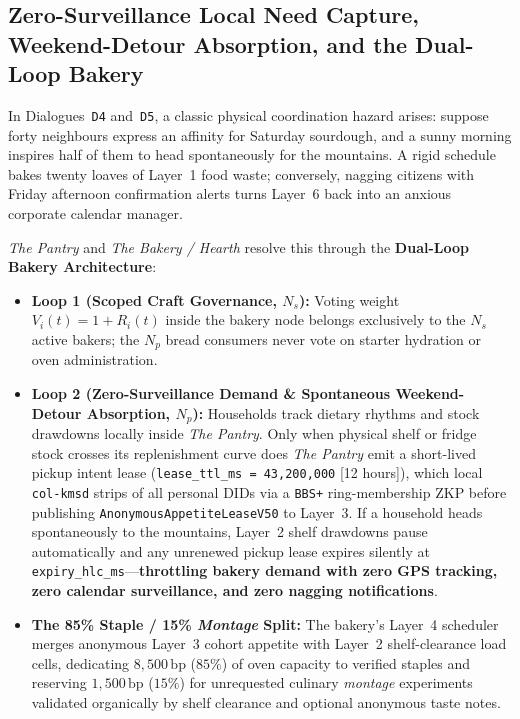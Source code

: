 \subsection{Zero-Surveillance Local Need Capture, Weekend-Detour Absorption, and the Dual-Loop Bakery}

In Dialogues~\texttt{D4} and~\texttt{D5}, a classic physical coordination hazard arises: suppose forty neighbours express an affinity for Saturday sourdough, and a sunny morning inspires half of them to head spontaneously for the mountains. A rigid schedule bakes twenty loaves of Layer~1 food waste; conversely, nagging citizens with Friday afternoon confirmation alerts turns Layer~6 back into an anxious corporate calendar manager.

\textit{The Pantry} and \textit{The Bakery / Hearth} resolve this through the \textbf{Dual-Loop Bakery Architecture}:
\begin{itemize}
  \item \textbf{Loop 1 (Scoped Craft Governance, $N_s$):} Voting weight $V_i(t) = 1 + R_i(t)$ inside the bakery node belongs exclusively to the $N_s$ active bakers; the $N_p$ bread consumers never vote on starter hydration or oven administration.
  \item \textbf{Loop 2 (Zero-Surveillance Demand \& Spontaneous Weekend-Detour Absorption, $N_p$):} Households track dietary rhythms and stock drawdowns locally inside \textit{The Pantry}. Only when physical shelf or fridge stock crosses its replenishment curve does \textit{The Pantry} emit a short-lived pickup intent lease (\texttt{lease\_ttl\_ms = 43,200,000} [12 hours]), which local \texttt{col-kmsd} strips of all personal DIDs via a \texttt{BBS+} ring-membership ZKP before publishing \texttt{AnonymousAppetiteLeaseV50} to Layer~3. If a household heads spontaneously to the mountains, Layer~2 shelf drawdowns pause automatically and any unrenewed pickup lease expires silently at \texttt{expiry\_hlc\_ms}---\textbf{throttling bakery demand with zero GPS tracking, zero calendar surveillance, and zero nagging notifications}.
  \item \textbf{The 85\% Staple / 15\% \textit{Montage} Split:} The bakery's Layer~4 scheduler merges anonymous Layer~3 cohort appetite with Layer~2 shelf-clearance load cells, dedicating $8{,}500\,\mathrm{bp}$ ($85\%$) of oven capacity to verified staples and reserving $1{,}500\,\mathrm{bp}$ ($15\%$) for unrequested culinary \textit{montage} experiments validated organically by shelf clearance and optional anonymous taste notes.
\end{itemize}

